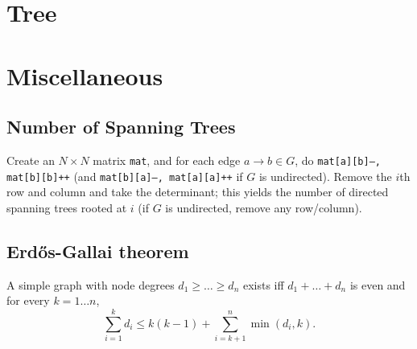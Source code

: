 \section{Tree}

\section{Miscellaneous}
\subsection{Number of Spanning Trees}
Create an $N\times N$ matrix \texttt{mat}, and for each edge $a \rightarrow b
   \in G$, do \texttt{mat[a][b]--, mat[b][b]++} (and \texttt{mat[b][a]--,
   mat[a][a]++} if $G$ is undirected). Remove the $i$th row and column and take
the determinant; this yields the number of directed spanning trees rooted at
$i$ (if $G$ is undirected, remove any row/column).

\subsection{Erdős-Gallai theorem}
A simple graph with node degrees $d_1 \ge \dots \ge d_n$ exists iff $d_1 +
   \dots + d_n$ is even and for every $k = 1\dots n$,
\[ \sum _{i=1}^{k}d_{i}\leq k(k-1)+\sum _{i=k+1}^{n}\min(d_{i},k). \]
\par
